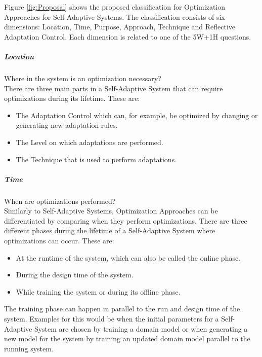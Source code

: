 Figure \ref{fig:Proposal} shows the proposed classification for Optimization Approaches for Self-Adaptive Systems.
The classification consists of six dimensions: Location, Time, Purpose, Approach, Technique and Reflective Adaptation Control.
Each dimension is related to one of the 5W+1H questions.
\newline
\par


\subparagraph*{Location}
Where in the system is an optimization necessary? \\
There are three main parts in a Self-Adaptive System that can require optimizations during its lifetime.
These are:
\begin{itemize}
    \item The Adaptation Control which can, for example, be optimized by changing or generating new adaptation rules.
    \item The Level on which adaptations are performed.
    \item The Technique that is used to perform adaptations.
\end{itemize}

\newpage
\subparagraph*{Time}
When are optimizations performed? \\
Similarly to Self-Adaptive Systems, Optimization Approaches can be differentiated by comparing when they perform optimizations.
There are three different phases during the lifetime of a Self-Adaptive System where optimizations can occur.
These are:
\begin{itemize}
    \item At the runtime of the system, which can also be called the online phase.
    \item During the design time of the system.
    \item While training the system or during its offline phase.
\end{itemize}
The training phase can happen in parallel to the run and design time of the system.
Examples for this would be when the initial parameters for a Self-Adaptive System are chosen by training a domain model
or when generating a new model for the system by training an updated domain model parallel to the running system.

